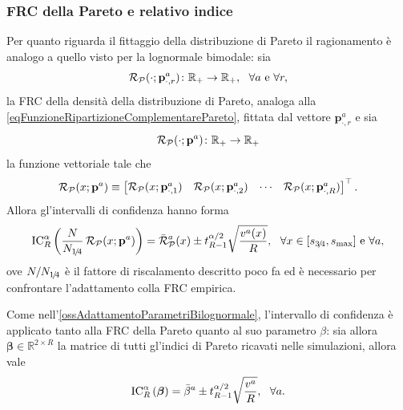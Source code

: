       \subsubsection{FRC della Pareto e relativo indice}

        Per quanto riguarda il fittaggio della distribuzione di Pareto il ragionamento è analogo a quello visto per la lognormale bimodale: sia
        \begin{equation*}
          \operatorname{\mathcal R}_{\mathcal P}(\cdot;\mathbf p^a_{\cdot,r})\colon\mathbb R_+\to\mathbb R_+,
          \ \ \forall a\text{ e }\forall r,
        \end{equation*}
        la FRC della densità della distribuzione di Pareto, analoga alla \cref{eqFunzioneRipartizioneComplementarePareto}, fittata dal vettore \(\mathbf p^a_{\cdot,r}\) e sia
        \begin{equation*}
          \operatorname{\mathcal R}_{\mathcal P}(\cdot;\mathbf p^a)\colon\mathbb R_+\to\mathbb R_+
        \end{equation*}
        la funzione vettoriale tale che
        \begin{equation*}
          \operatorname{\mathcal R}_{\mathcal P}(x;\mathbf p^a)\equiv
          \begin{bmatrix}
            \operatorname{\mathcal R}_{\mathcal P}(x;\mathbf p^a_{\cdot,1})&
            \operatorname{\mathcal R}_{\mathcal P}(x;\mathbf p^a_{\cdot,2})&
            \cdots&
            \operatorname{\mathcal R}_{\mathcal P}(x;\mathbf p^a_{\cdot,R})
          \end{bmatrix}^\top.
        \end{equation*}
        Allora gl'intervalli di confidenza hanno forma
        \begin{equation*}
          \operatorname{IC}_R^{\alpha}\left(\frac N{N_{1\hspace{-0.15em}/\hspace{-0.15em}4}}\operatorname{\mathcal R}_{\mathcal P}(x;\mathbf p^a)\right)
          =\bar{\operatorname{\mathcal R}}_{\mathcal P}^a(x)\pm t^{\alpha/2}_{R-1}\sqrt{\frac{v^a(x)}R},
          \ \ \forall x\in[s_{3\hspace{-0.15em}/\hspace{-0.15em}4},s_{\max}]\text{ e }\forall a,
        \end{equation*}
        ove \(N/N_{1\hspace{-0.15em}/\hspace{-0.15em}4}\) è il fattore di riscalamento descritto poco fa ed è necessario per confrontare l'adattamento colla FRC empirica.

        \begin{oss}
          Come nell'\cref{ossAdattamentoParametriBilognormale}, l'intervallo di confidenza è applicato tanto alla FRC della Pareto quanto al suo parametro \(\beta\): sia allora \(\boldsymbol\beta\in\mathbb R^{2\times R}\) la matrice di tutti gl'indici di Pareto ricavati nelle simulazioni, allora vale
          \[
            \operatorname{IC}_R^\alpha\left(\boldsymbol\beta\right)
            =\bar\beta^a\pm t^{\alpha/2}_{R-1}\sqrt{\frac{v^a}R},
            \ \ \forall a.
          \]
        \end{oss}
    
